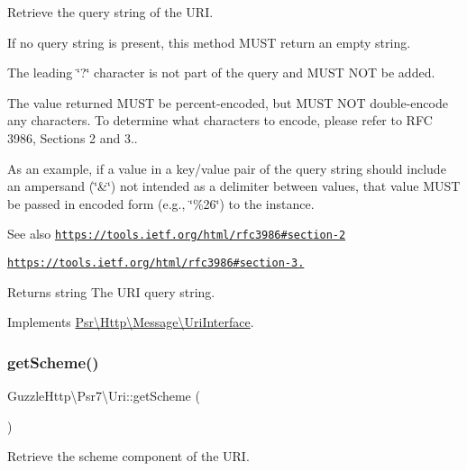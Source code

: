 Retrieve the query string of the U\+RI.

If no query string is present, this method M\+U\+ST return an empty string.

The leading \char`\"{}?\char`\"{} character is not part of the query and M\+U\+ST N\+OT be added.

The value returned M\+U\+ST be percent-\/encoded, but M\+U\+ST N\+OT double-\/encode any characters. To determine what characters to encode, please refer to R\+FC 3986, Sections 2 and 3..

As an example, if a value in a key/value pair of the query string should include an ampersand (\char`\"{}\&\char`\"{}) not intended as a delimiter between values, that value M\+U\+ST be passed in encoded form (e.\+g., \char`\"{}\%26\char`\"{}) to the instance.

\begin{DoxySeeAlso}{See also}
\href{https://tools.ietf.org/html/rfc3986#section-2}{\tt https\+://tools.\+ietf.\+org/html/rfc3986\#section-\/2} 

\href{https://tools.ietf.org/html/rfc3986#section-3.4}{\tt https\+://tools.\+ietf.\+org/html/rfc3986\#section-\/3.} 
\end{DoxySeeAlso}
\begin{DoxyReturn}{Returns}
string The U\+RI query string. 
\end{DoxyReturn}


Implements \hyperlink{interfacePsr_1_1Http_1_1Message_1_1UriInterface_a859c8c892d038ba2f1a92b1dfa806ecc}{Psr\textbackslash{}\+Http\textbackslash{}\+Message\textbackslash{}\+Uri\+Interface}.

\mbox{\label{classGuzzleHttp_1_1Psr7_1_1Uri_a3357bfcc071b00cecace2fa086bea14a}} 
\subsubsection{\texorpdfstring{get\+Scheme()}{getScheme()}}
{\footnotesize\ttfamily Guzzle\+Http\textbackslash{}\+Psr7\textbackslash{}\+Uri\+::get\+Scheme (\begin{DoxyParamCaption}{ }\end{DoxyParamCaption})}

Retrieve the scheme component of the U\+RI.

